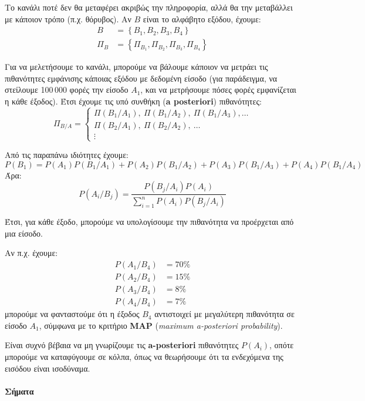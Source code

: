 \documentclass[11pt,a4paper,notitlepage,fleqn,final]{article}
\begin{document}
	Το κανάλι ποτέ δεν θα μεταφέρει ακριβώς την πληροφορία, αλλά θα
	την μεταβάλλει με κάποιον τρόπο (π.χ. θόρυβος). Αν \( B \) είναι το
	αλφάβητο εξόδου, έχουμε:
	\begin{align*}
	B &= \left\lbrace B_1,B_2,B_3,B_4 \right\rbrace \\
	\Pi_B &= \left\lbrace 
	\Pi_{B_1},\Pi_{B_2},\Pi_{B_3},\Pi_{B_4}
	\right\rbrace
	\end{align*}
	
	Για να μελετήσουμε το κανάλι, μπορούμε να βάλουμε κάποιον να μετράει
	τις πιθανότητες εμφάνισης κάποιας εξόδου με δεδομένη είσοδο (για
	παράδειγμα, να στείλουμε 100\,000 φορές την είσοδο \( A_1 \), και
	να μετρήσουμε πόσες φορές εμφανίζεται η κάθε έξοδος). Έτσι έχουμε
	τις υπό συνθήκη (\textbf{a posteriori}) πιθανότητες:
	\[
	\Pi_{B/A} = \begin{cases}
	\Pi(B_1/A_1),\ \Pi(B_1/A_2),\ \Pi(B_1/A_3), \dots \\
	\Pi(B_2/A_1),\ \Pi(B_2/A_2),\ \dots \\
	\vdots
	\end{cases}
	\]
	
	Από τις παραπάνω ιδιότητες έχουμε:
	\[
	P(B_1) = P(A_1)P(B_1/A_1)
	+P(A_2)P(B_1/A_2)
	+P(A_3)P(B_1/A_3)
	+P(A_4)P(B_1/A_4)
	\]
	Άρα:
	\[
		P(A_i/B_j) = \frac{P(B_j/A_i)P(A_i)}{
			\sum_{i=1}^n P(A_i)P(B_j/A_i)
			}
	\]
	
	Έτσι, για κάθε έξοδο, μπορούμε να υπολογίσουμε την πιθανότητα
	να προέρχεται από μια είσοδο.
	
	Αν π.χ. έχουμε: \begin{align*}
		P(A_1/B_4) &= 70\% \\
		P(A_2/B_4) &= 15\% \\
		P(A_3/B_4) &= 8\% \\
		P(A_4/B_4) &= 7\%
	\end{align*}
	μπορούμε να φανταστούμε ότι η έξοδος \( B_4 \) αντιστοιχεί με
	μεγαλύτερη πιθανότητα σε είσοδο \( A_1 \), σύμφωνα με το κριτήριο
	\textbf{MAP} (\textit{maximum a-posteriori probability}).
	
	Είναι συχνό βέβαια να μη γνωρίζουμε τις \textbf{a-posteriori}
	πιθανότητες \( P(A_i) \), οπότε μπορούμε να καταφύγουμε σε κόλπα,
	όπως να θεωρήσουμε ότι τα ενδεχόμενα της εισόδου είναι ισοδύναμα.
	
	\paragraph{Σήματα}
	
\end{document}

